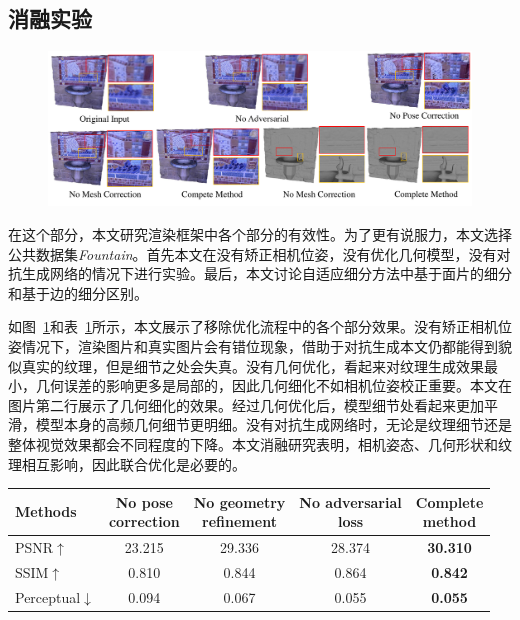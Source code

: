 \subsection{消融实验}
\begin{figure}[!t]
\centering
\includegraphics[width=1\linewidth]{pic/work2/compare4.pdf}

\label{fig:ex2_5}
\end{figure}





在这个部分，本文研究渲染框架中各个部分的有效性。为了更有说服力，本文选择公共数据集\emph{Fountain}。首先本文在没有矫正相机位姿，没有优化几何模型，没有对抗生成网络的情况下进行实验。最后，本文讨论自适应细分方法中基于面片的细分和基于边的细分区别。\par
如图~\ref{fig:ex2_5}和表~\ref{tab:ablation2}所示，本文展示了移除优化流程中的各个部分效果。没有矫正相机位姿情况下，渲染图片和真实图片会有错位现象，借助于对抗生成本文仍都能得到貌似真实的纹理，但是细节之处会失真。没有几何优化，看起来对纹理生成效果最小，几何误差的影响更多是局部的，因此几何细化不如相机位姿校正重要。本文在图片第二行展示了几何细化的效果。经过几何优化后，模型细节处看起来更加平滑，模型本身的高频几何细节更明细。没有对抗生成网络时，无论是纹理细节还是整体视觉效果都会不同程度的下降。本文消融研究表明，相机姿态、几何形状和纹理相互影响，因此联合优化是必要的。\par

\begin{table}[!h]
\renewcommand{\arraystretch}{1.3}
\label{tab:ablation2}
	\centering
		\begin{tabular}{lcccc}
			\hline
			{Methods} & \tabincell{c}{No pose \\ correction} & \tabincell{c}{No geometry \\ refinement} & \tabincell{c}{No adversarial \\ loss} & \tabincell{c}{Complete \\ method} \\
			\hline
			PSNR$\uparrow$ & 23.215 & 29.336 & 28.374 & \textbf{30.310}\\
			SSIM$\uparrow$ & 0.810 & 0.844 & 0.864 & \textbf{0.842}\\
			Perceptual$\downarrow$ & 0.094 & 0.067 & 0.055 & \textbf{0.055}\\
			\hline
		\end{tabular}
\end{table}

